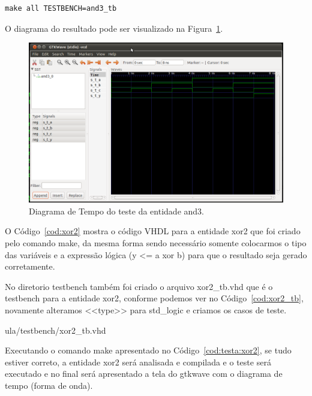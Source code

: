 \documentclass[a4paper,11pt]{report}
\begin{document}
\lstset{numbers=left, numberstyle=\tiny, stepnumber=1, numbersep=3pt}
\begin{lstlisting}[label=cod:testa:and3,caption=Comando para executar o testbench da entidade and3.]
  make all TESTBENCH=and3_tb
\end{lstlisting}

O diagrama do resultado pode ser visualizado na Figura~\ref{fig:gtw:and3}.

\begin{figure}[H]
\centering
\includegraphics[width=1\textwidth]{figuras/gtw_and3.png}
\caption{Diagrama de Tempo do teste da entidade and3.}
\label{fig:gtw:and3}
\end{figure}

O Código~\ref{cod:xor2} mostra o código VHDL para a entidade xor2 que foi criado pelo comando make, da mesma forma sendo necessário somente colocarmos o tipo das variáveis e a expressão lógica (y <= a xor b) para que o resultado seja gerado corretamente.

\lstset{language=VHDL}
\lstset{numbers=left, numberstyle=\tiny, stepnumber=1, numbersep=3pt}


No diretorio testbench também foi criado o arquivo xor2\_tb.vhd que é o testbench para a entidade xor2, conforme podemos ver no Código~\ref{cod:xor2_tb}, novamente alteramos <<type>> para std\_logic e criamos os casos de teste.

\lstset{language=VHDL}
\lstset{numbers=left, numberstyle=\tiny, stepnumber=1, numbersep=3pt}
 {ula/testbench/xor2_tb.vhd}

Executando o comando make apresentado no Código~\ref{cod:testa:xor2}, se tudo estiver correto, a entidade xor2 será analisada e compilada e o teste será executado e no final será apresentado a tela do gtkwave com o diagrama de tempo (forma de onda).
\end{document}
